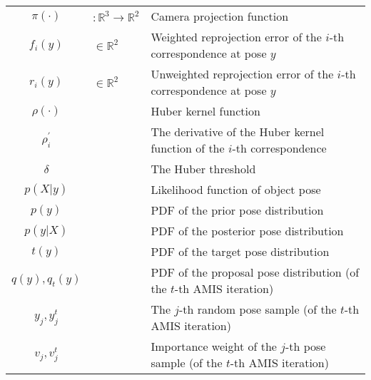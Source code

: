 \documentclass[10pt,twocolumn,letterpaper]{article}
\begin{document}
\begin{table*}[b]
\begin{center}
{\begin{tabular}{cll}
        $\pi(\cdot)$ & $: \mathbb{R}^3 \rightarrow \mathbb{R}^2 $ & Camera  projection function\\
        $f_i(y)$ & $\in \mathbb{R}^2$ & Weighted reprojection error of the $i$-th correspondence at pose $y$\\
        $r_i(y)$ & $\in \mathbb{R}^2$ & Unweighted reprojection error of the $i$-th correspondence at pose $y$\\
        $\rho(\cdot)$ & & Huber kernel function\\
        $\rho^\prime_i$ & & The derivative of the Huber kernel function of the $i$-th correspondence\\
        $\delta$ & & The Huber threshold\\
        $p(X|y)$ & & Likelihood function of object pose\\
        $p(y)$ & & PDF of the prior pose distribution\\
        $p(y|X)$ & & PDF of the posterior pose distribution\\
        $t(y)$ & & PDF of the target pose distribution\\

        $q(y), q_t(y)$ & & PDF of the proposal pose distribution (of the $t$-th AMIS iteration)\\
        $y_j, y_j^t$ & & The $j$-th random pose sample (of the $t$-th AMIS iteration)\\
        $v_j, v_j^t$ & & Importance weight of the $j$-th pose sample (of the $t$-th AMIS iteration)\\
        

\end{tabular}}
\end{center}
\end{table*}
\end{document}
